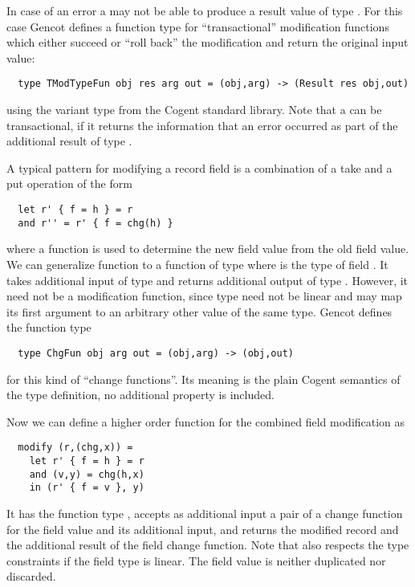 In case of an error a  may not be able to produce a result value of type . For this case Gencot defines 
a function type for ``transactional'' modification functions which either succeed or ``roll back'' the modification and return 
the original input value:
\begin{verbatim}
  type TModTypeFun obj res arg out = (obj,arg) -> (Result res obj,out)
\end{verbatim}
using the variant type  from the Cogent standard library. Note that a  can be transactional, if it
returns the information that an error occurred as part of the additional result of type .

A typical pattern for modifying a record field  is a combination of a take and a put operation of the form
\begin{verbatim}
  let r' { f = h } = r 
  and r'' = r' { f = chg(h) }
\end{verbatim}
where a function  is used to determine the new field value from the old field value. We can generalize function
 to a function of type  where  is the type of field . It takes 
additional input of type  and returns additional output of type . However, it need not be a modification
function, since type  need not be linear and  may map its first argument to an arbitrary other value
of the same type. Gencot defines the function type
\begin{verbatim}
  type ChgFun obj arg out = (obj,arg) -> (obj,out)
\end{verbatim}
for this kind of ``change functions''. Its meaning is the plain Cogent semantics of the type definition, no additional property is 
included.

Now we can define a higher order function for the combined field modification as
\begin{verbatim}
  modify (r,(chg,x)) = 
    let r' { f = h } = r
    and (v,y) = chg(h,x)
    in (r' { f = v }, y)
\end{verbatim}
It has the function type , accepts as additional input a pair of a change
function for the field value and its additional input, and returns the modified record and the additional result of
the field change function. Note that  also respects the type constraints if the field type 
is linear. The field value is neither duplicated nor discarded.

